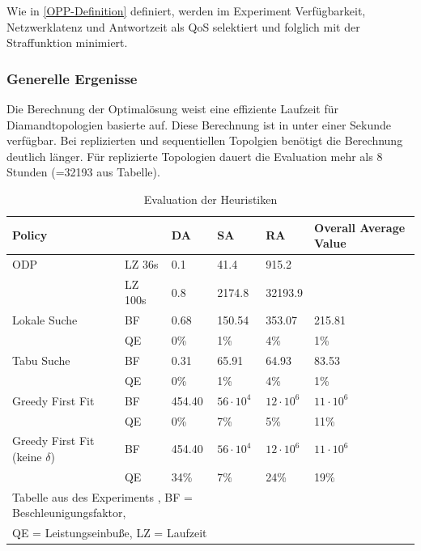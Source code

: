 \documentclass{article}
\begin{document}
Wie in \ref{OPP-Definition} definiert, werden im Experiment Verfügbarkeit, 
Netzwerklatenz und Antwortzeit als QoS selektiert und folglich mit der Straffunktion minimiert. 




\subsubsection{Generelle Ergenisse}

Die Berechnung der Optimalösung weist eine effiziente Laufzeit für Diamandtopologien basierte auf. 
Diese Berechnung ist in unter einer Sekunde verfügbar. Bei replizierten und sequentiellen Topolgien benötigt die Berechnung deutlich länger. 
Für replizierte Topologien dauert die Evaluation mehr als 8 Stunden (=32193 aus Tabelle). \\
\begin{table}[htbp]  
    \centering
    \caption{Evaluation der Heuristiken}
    \begin{tabular}{llllll}
    \toprule
    Policy                           &       & DA        & SA              & RA                & Overall Average Value                  \\
    \midrule
    ODP                              &LZ 36s &  0.1      & 41.4             & 915.2            &                  \\
                                     &LZ 100s&  0.8      & 2174.8           & 32193.9          &                  \\
    \cmidrule{1-5}
    Lokale Suche                     &BF     &  0.68     & 150.54           & 353.07           & 215.81           \\
                                     &QE     &0\%        & 1\%              &4\%               & 1\%              \\
    Tabu Suche                       &BF     &  0.31     & 65.91            & 64.93            & 83.53            \\
                                     &QE     &0\%        & 1\%              &4\%               & 1\%              \\           
    Greedy First Fit                 &BF     &  454.40   & $56 \cdot 10^4$  & $12 \cdot 10^6$  & $11 \cdot 10^6$  \\
                                     &QE     &0\%        & 7\%              &5\%               &11\%              \\
    Greedy First Fit (keine $\delta$)&BF     &  454.40   & $56 \cdot 10^4$  & $12 \cdot 10^6$  & $11 \cdot 10^6$  \\
                                     &QE     &34\%       & 7\%              &24\%              & 19\%             \\
    \bottomrule
    \multicolumn{4}{l}{\footnotesize Tabelle aus des Experiments \cite{efficient-operator-placement}, BF = Beschleunigungsfaktor,}\\
    \multicolumn{4}{l}{\footnotesize QE = Leistungseinbuße, LZ = Laufzeit}\\
    \end{tabular}
\end{table} \label{experiment-tabelle}
\end{document}
